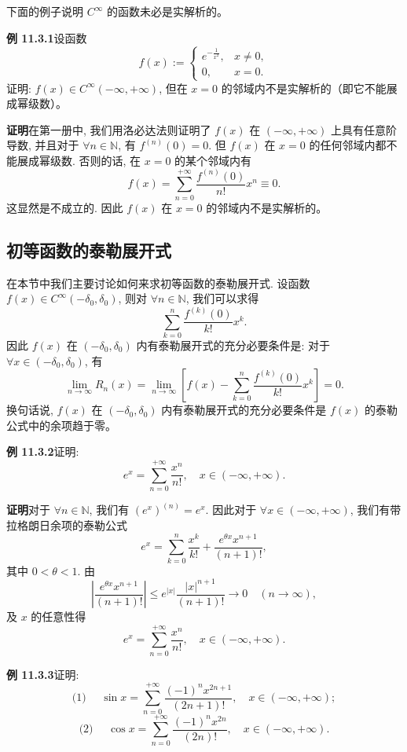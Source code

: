 \documentclass[UTF8,12pt,a4paper,fontset=fandol]{ctexart}
\begin{document}
下面的例子说明 $C^\infty$ 的函数未必是实解析的。

\noindent\textbf{例 11.3.1}\quad 设函数
\[
  f(x):=
  \begin{cases}
    e^{-\frac1{x^2}}, & x\ne0,\\
    0, & x=0.
  \end{cases}
\]
证明: $f(x)\in C^\infty(-\infty,+\infty)$, 但在 $x=0$ 的邻域内不是实解析的（即它不能展成幂级数）。

\noindent\textbf{证明}\quad 在第一册中, 我们用洛必达法则证明了 $f(x)$ 在 $(-\infty,+\infty)$ 上具有任意阶导数, 并且对于 $\forall n\in\mathbb N$, 有 $f^{(n)}(0)=0$. 但 $f(x)$ 在 $x=0$ 的任何邻域内都不能展成幂级数. 否则的话, 在 $x=0$ 的某个邻域内有
\[
  f(x)=\sum_{n=0}^{+\infty}\frac{f^{(n)}(0)}{n!}x^n\equiv0.
\]
这显然是不成立的. 因此 $f(x)$ 在 $x=0$ 的邻域内不是实解析的。

\subsection{初等函数的泰勒展开式}

在本节中我们主要讨论如何来求初等函数的泰勒展开式. 设函数
$f(x)\in C^\infty(-\delta_0,\delta_0)$, 则对 $\forall n\in\mathbb N$, 我们可以求得
\[
  \sum_{k=0}^{n}\frac{f^{(k)}(0)}{k!}x^k.
\]
因此 $f(x)$ 在 $(-\delta_0,\delta_0)$ 内有泰勒展开式的充分必要条件是: 对于 $\forall x\in(-\delta_0,\delta_0)$, 有
\[
  \lim_{n\to\infty}R_n(x)
  =
  \lim_{n\to\infty}
  \left[
    f(x)-\sum_{k=0}^{n}\frac{f^{(k)}(0)}{k!}x^k
  \right]
  =0.
\]
换句话说, $f(x)$ 在 $(-\delta_0,\delta_0)$ 内有泰勒展开式的充分必要条件是 $f(x)$ 的泰勒公式中的余项趋于零。

\noindent\textbf{例 11.3.2}\quad 证明:
\[
  e^x=\sum_{n=0}^{+\infty}\frac{x^n}{n!},
  \quad x\in(-\infty,+\infty).
\]

\noindent\textbf{证明}\quad 对于 $\forall n\in\mathbb N$, 我们有 $(e^x)^{(n)}=e^x$. 因此对于 $\forall x\in(-\infty,+\infty)$, 我们有带拉格朗日余项的泰勒公式
\[
  e^x=\sum_{k=0}^{n}\frac{x^k}{k!}
  +\frac{e^{\theta x}x^{n+1}}{(n+1)!},
\]
其中 $0<\theta<1$. 由
\[
  \left|\frac{e^{\theta x}x^{n+1}}{(n+1)!}\right|
  \leqslant
  e^{|x|}\frac{|x|^{n+1}}{(n+1)!}
  \to0\quad(n\to\infty),
\]
及 $x$ 的任意性得
\[
  e^x=\sum_{n=0}^{+\infty}\frac{x^n}{n!},
  \quad x\in(-\infty,+\infty).
\]

\noindent\textbf{例 11.3.3}\quad 证明:
\[
  \text{(1) }\quad
  \sin x=\sum_{n=0}^{+\infty}\frac{(-1)^nx^{2n+1}}{(2n+1)!},
  \quad x\in(-\infty,+\infty);
\]
\[
  \text{(2) }\quad
  \cos x=\sum_{n=0}^{+\infty}\frac{(-1)^nx^{2n}}{(2n)!},
  \quad x\in(-\infty,+\infty).
\]
\end{document}
